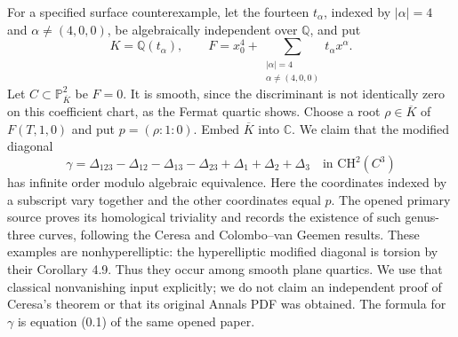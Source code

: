 For a specified surface counterexample, let the fourteen
$t_\alpha$, indexed by $|\alpha|=4$ and
$\alpha\ne(4,0,0)$, be algebraically independent over
$\mathbb Q$, and put
\[
 K=\mathbb Q(t_\alpha),\qquad
 F=x_0^4+\sum_{\substack{|\alpha|=4\\\alpha\ne(4,0,0)}}
                      t_\alpha x^\alpha.
\]
Let $C\subset\mathbb P^2_{\overline K}$ be $F=0$.
It is smooth, since the discriminant is not identically zero
on this coefficient chart, as the Fermat quartic shows.
Choose a root $\rho\in\overline K$ of $F(T,1,0)$ and put
$p=(\rho:1:0)$. Embed $\overline K$ into $\mathbb C$.
We claim that the modified diagonal
\[
 \gamma=\Delta_{123}-\Delta_{12}-\Delta_{13}-\Delta_{23}
                     +\Delta_1+\Delta_2+\Delta_3
             \quad\text{in }\mathrm{CH}^{2}(C^3)
\]
has infinite order modulo algebraic equivalence. Here the
coordinates indexed by a subscript vary together and the other
coordinates equal $p$. The opened primary source
\citet[Proposition 3.1, p.~654, and the paragraph immediately
after Corollary 4.9, p.~659]{cyGrossSchoen1995} proves its
homological triviality and records the existence of such
genus-three curves, following the Ceresa and Colombo--van Geemen
results. These examples are nonhyperelliptic: the hyperelliptic
modified diagonal is torsion by their Corollary 4.9.
Thus they occur among smooth plane quartics. We use that
classical nonvanishing input explicitly;
we do not claim an independent proof of Ceresa's theorem or
that its original Annals PDF was obtained. The formula for
$\gamma$ is equation (0.1) of the same opened paper.

